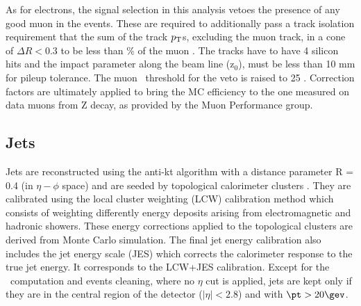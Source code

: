 As for electrons, the signal selection in this analysis vetoes the presence of any good muon in the events.
These are required to additionally pass a track isolation requirement that the sum of the track $p_{\rm T}$s, excluding the muon track, in a cone of $\Delta R < 0.3$ to be less than  \unit[12]{\%} of the
muon \pt.  The tracks have to
have 4 silicon hits and the impact parameter along the beam line (z$_{0}$), must be less than 10 mm for pileup tolerance. The muon \pt\ threshold for the veto is raised to 25 \gev. Correction factors are ultimately
applied to bring the MC efficiency to the one measured on data muons from Z decay, as provided by the Muon Performance group.

\subsection{Jets}
\label{sec:jet_obj}
Jets are reconstructed using the anti-kt algorithm \cite{Cacciari:2008gp} with a distance parameter R = 0.4  (in $\eta - \phi$ space) and
are seeded by topological calorimeter clusters \cite{Lampl:1099735}. They are calibrated using the local cluster weighting
(LCW) calibration method which consists of weighting differently energy deposits arising from electromagnetic and hadronic showers. These energy corrections applied to the topological clusters are derived
from Monte Carlo simulation. The final jet energy calibration also includes the jet energy scale (JES)  %
which corrects the calorimeter response to the true jet energy. It corresponds to the LCW+JES calibration.
Except for the \MET\ computation and events cleaning, where no $\eta$ cut is applied, jets are kept only if they are in the
central region of the detector ($|\eta|<2.8$) and with $\pt > 20\gev$.

